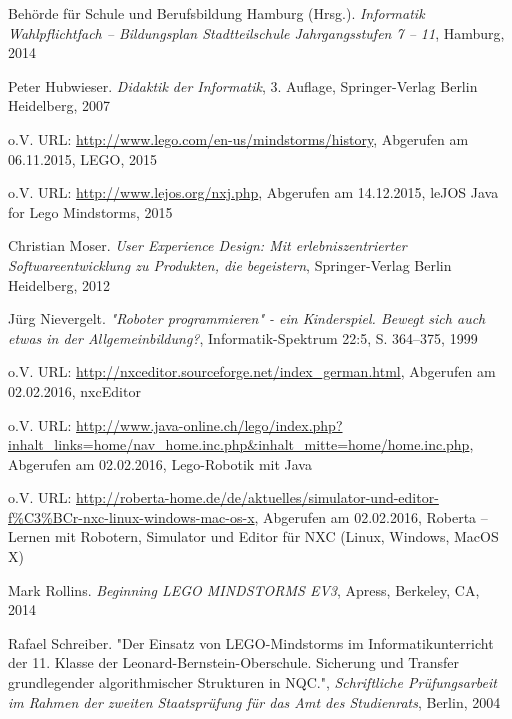 \begin{thebibliography}{ABCDEF}
Behörde für Schule und Berufsbildung Hamburg (Hrsg.). \emph{Informatik Wahlpflichtfach -- Bildungsplan Stadtteilschule Jahrgangsstufen 7 -- 11}, Hamburg, 2014

Peter Hubwieser. \emph{Didaktik der Informatik}, 3. Auflage, Springer-Verlag Berlin Heidelberg, 2007


o.V. URL: \url{http://www.lego.com/en-us/mindstorms/history}, Abgerufen am 06.11.2015, LEGO, 2015

o.V. URL: \url{http://www.lejos.org/nxj.php}, Abgerufen am 14.12.2015, leJOS Java for Lego Mindstorms, 2015

Christian Moser. \emph{User Experience Design: Mit erlebniszentrierter Softwareentwicklung zu Produkten, die begeistern}, Springer-Verlag Berlin Heidelberg, 2012

Jürg Nievergelt. \emph{"Roboter programmieren" - ein Kinderspiel. Bewegt sich auch etwas in der Allgemeinbildung?}, Informatik-Spektrum 22:5, S. 364--375, 1999

o.V. URL: \url{http://nxceditor.sourceforge.net/index_german.html}, Abgerufen am 02.02.2016, nxcEditor

o.V. URL: \url{http://www.java-online.ch/lego/index.php?inhalt_links=home/nav_home.inc.php&inhalt_mitte=home/home.inc.php}, Abgerufen am 02.02.2016, Lego-Robotik mit Java 

o.V. URL: \url{http://roberta-home.de/de/aktuelles/simulator-und-editor-f\%C3\%BCr-nxc-linux-windows-mac-os-x}, Abgerufen am 02.02.2016, Roberta -- Lernen mit Robotern, Simulator und Editor für NXC (Linux, Windows, MacOS X)

Mark Rollins. \emph{Beginning LEGO MINDSTORMS EV3}, Apress, Berkeley, CA, 2014

Rafael Schreiber. "Der Einsatz von LEGO-Mindstorms im Informatikunterricht der 11. Klasse der Leonard-Bernstein-Oberschule. Sicherung und Transfer grundlegender algorithmischer Strukturen in NQC.", \emph{Schriftliche Prüfungsarbeit im Rahmen der zweiten Staatsprüfung für das Amt des Studienrats}, Berlin, 2004


\end{thebibliography}
